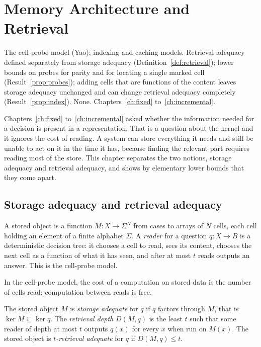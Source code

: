 \chapter{Memory Architecture and Retrieval}\label{ch:retrieval}
{The cell-probe model (Yao); indexing and caching models.}
{Retrieval adequacy defined separately from storage adequacy (Definition~\ref{def:retrieval}); lower bounds on probes for parity and for locating a single marked cell (Result~\ref{prop:probes}); adding cells that are functions of the content leaves storage adequacy unchanged and can change retrieval adequacy completely (Result~\ref{prop:index}).}
{None.}
{Chapters~\ref{ch:fixed} to~\ref{ch:incremental}.}

Chapters~\ref{ch:fixed} to~\ref{ch:incremental} asked whether the information needed for a decision is present in a representation. That is a question about the kernel and it ignores the cost of reading. A system can store everything it needs and still be unable to act on it in the time it has, because finding the relevant part requires reading most of the store. This chapter separates the two notions, storage adequacy and retrieval adequacy, and shows by elementary lower bounds that they come apart.

\section{Storage adequacy and retrieval adequacy}

A stored object is a function $M:X\to\Sigma^{N}$ from cases to arrays of $N$ cells, each cell holding an element of a finite alphabet $\Sigma$. A \emph{reader} for a question $q:X\to B$ is a deterministic decision tree: it chooses a cell to read, sees its content, chooses the next cell as a function of what it has seen, and after at most $t$ reads outputs an answer. This is the cell-probe model.

\begin{established}
In the cell-probe model, the cost of a computation on stored data is the number of cells read; computation between reads is free.
\end{established}

\begin{definition}\label{def:retrieval}
The stored object $M$ is \emph{storage adequate} for $q$ if $q$ factors through $M$, that is $\ker M\subseteq\ker q$. The \emph{retrieval depth} $D(M,q)$ is the least $t$ such that some reader of depth at most $t$ outputs $q(x)$ for every $x$ when run on $M(x)$. The stored object is \emph{$t$-retrieval adequate} for $q$ if $D(M,q)\le t$.
\end{definition}

